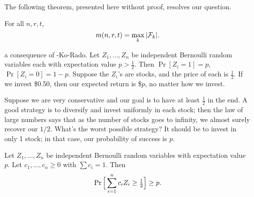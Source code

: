 The following theorem, presented here without proof, resolves our question.
\begin{theorem}
For all $n,r,t$,
\[
m(n,r,t) = \max_k |\mathcal{F}_k|.
\]
\end{theorem}

 a consequence of \erdos-Ko-Rado. Let $Z_1,\dotsc,Z_n$ be independent Bernoulli random variables  each  with expectation value $p > \tfrac{1}{2}$. Then $\Pr[Z_i=1] = p$, $\Pr[Z_i = 0] = 1-p$.
Suppose the $Z_i$'s are stocks, and the price of each is $\tfrac{1}{2}$. If we invest \$0.50, then our expected return is \$$p$, no matter how we invest.

Suppose we are very conservative and our goal is to have at least $\tfrac{1}{2}$ in the end. A good strategy is to diversify and invest uniformly in each stock; then the law of large numbers says that as the number of stocks goes to infinity, we almost surely recover our $1/2$.
What's the worst possible strategy? It should be to invest in only 1 stock; in that case, our probability of success is $p$.
\begin{theorem}
Let $Z_1,\dotsc,Z_n$ be independent Bernoulli random variables with expectation value $p$. Let $c_1,\dotsc,c_n\geq 0$ with $\sum c_i =1$. Then
\[
\operatorname{Pr} \Big[ \sum_{i=1}^nc_i Z_i \geq \tfrac{1}{2} \Big] \geq p.
\]
\end{theorem}
